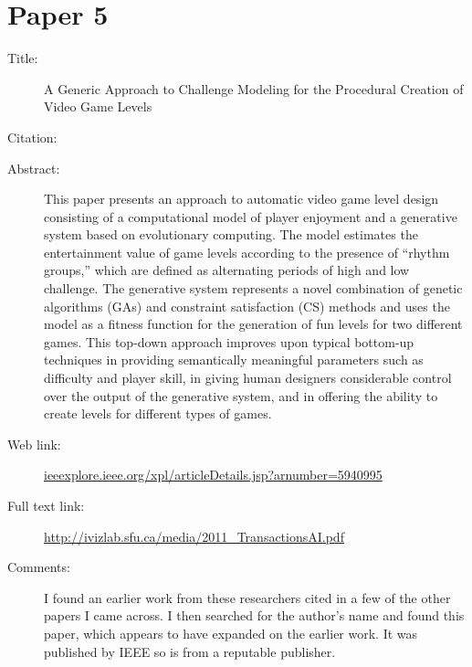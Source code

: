 \documentclass{scrartcl}
\begin{document}
\section*{Paper 5}
\begin{description}
\item[Title:] A Generic Approach to Challenge Modeling for the Procedural Creation of Video Game Levels
\item[Citation:] \cite{sorenson:generic}
\item[Abstract:] This paper presents an approach to automatic video game level design consisting of a computational model of player enjoyment and a generative system based on evolutionary computing. The model estimates the entertainment value of game levels according to the presence of “rhythm groups,” which are defined as alternating periods of high and low challenge. The generative system represents a novel combination of genetic algorithms (GAs) and constraint satisfaction (CS) methods and uses the model as a fitness function for the generation of fun levels for two different games. This top-down approach improves upon typical bottom-up techniques in providing semantically meaningful parameters such as difficulty and player skill, in giving human designers considerable control over the output of the generative system, and in offering the ability to create levels for different types of games.
\item[Web link:] \url{ieeexplore.ieee.org/xpl/articleDetails.jsp?arnumber=5940995}
\item[Full text link:] \url{http://ivizlab.sfu.ca/media/2011_TransactionsAI.pdf}
\item[Comments:] I found an earlier work from these researchers cited in a few of the other papers I came across. I then searched for the author's name and found this paper, which appears to have expanded on the earlier work. It was published by IEEE so is from a reputable publisher.
\end{description}



\end{document}
